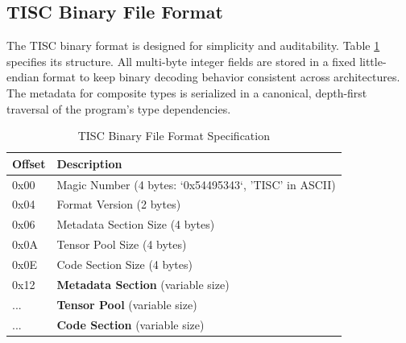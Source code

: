 \documentclass[sigconf, 10pt]{acmart}
\begin{document}
\subsection{TISC Binary File Format}
The TISC binary format is designed for simplicity and auditability. Table \ref{tab:tisc_format} specifies its structure. All multi-byte integer fields are stored in a fixed little-endian format to keep binary decoding behavior consistent across architectures. The metadata for composite types is serialized in a canonical, depth-first traversal of the program's type dependencies.
\begin{table}[h]
\centering
\caption{TISC Binary File Format Specification}
\label{tab:tisc_format}
\begin{tabular}{|l|l|}
\hline
\textbf{Offset} & \textbf{Description} \\
\hline
0x00 & Magic Number (4 bytes: `0x54495343`, 'TISC' in ASCII) \\
0x04 & Format Version (2 bytes) \\
0x06 & Metadata Section Size (4 bytes) \\
0x0A & Tensor Pool Size (4 bytes) \\
0x0E & Code Section Size (4 bytes) \\
0x12 & \textbf{Metadata Section} (variable size) \\
... & \textbf{Tensor Pool} (variable size) \\
... & \textbf{Code Section} (variable size) \\
\hline
\end{tabular}
\end{table}
\end{document}
